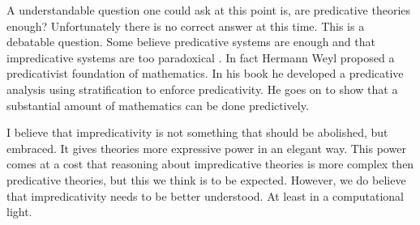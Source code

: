 A understandable question one could ask at this point is, are
predicative theories enough? Unfortunately there is no correct answer
at this time.  This is a debatable question.  Some believe
predicative systems are enough and that impredicative systems are too
paradoxical \cite{Feferman:2005}.  In fact Hermann Weyl proposed a
predicativist foundation of mathematics.  In his book \cite{Weyl:1918}
he developed a predicative analysis using stratification to enforce
predicativity.  He goes on to show that a substantial amount of
mathematics can be done predictively.

I believe that impredicativity is not something that should be
abolished, but embraced.  It gives theories more expressive power in
an elegant way. This power comes at a cost that reasoning about
impredicative theories is more complex then predicative theories, but
this we think is to be expected.  However, we do believe that
impredicativity needs to be better understood.  At least in a
computational light.  
